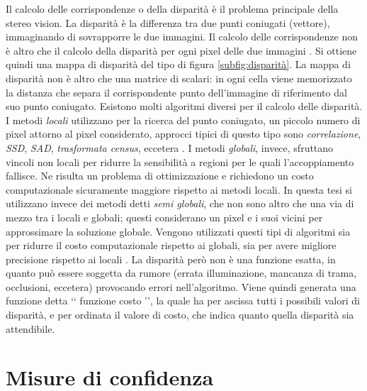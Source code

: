 \documentclass[12pt]{report}
\newcommand{\nullpage}{\newpage\null\thispagestyle{empty}}  %
\begin{document}
			
			
			Il calcolo delle corrispondenze o della disparità è il problema principale della stereo vision.	La disparità è la differenza tra due punti coniugati (vettore), immaginando di sovrapporre le due immagini. Il calcolo delle corrispondenze non è altro che il calcolo della disparità per ogni pixel delle due immagini \cite{fusiello}. Si ottiene quindi una mappa di disparità del tipo di figura \ref{subfig:disparità}. La mappa di disparità non è altro che una matrice di scalari: in ogni cella viene memorizzato la distanza che separa il corrispondente punto dell'immagine di riferimento dal suo punto coniugato.\newline
			Esistono molti algoritmi diversi per il calcolo delle disparità. I metodi \textit{locali} utilizzano per la ricerca del punto coniugato, un piccolo numero di pixel attorno al pixel considerato, approcci tipici di questo tipo sono \textit{correlazione}, \textit{SSD}, \textit{SAD}, \textit{trasformata census}, eccetera \cite{correlation}. I metodi \textit{globali}, invece, sfruttano vincoli non locali per ridurre la sensibilità a regioni per le quali l'accoppiamento fallisce. Ne risulta un problema di ottimizzazione e richiedono un costo computazionale sicuramente maggiore rispetto ai metodi locali. In questa tesi si utilizzano invece dei metodi detti \textit{semi globali}, che non sono altro che una via di mezzo tra i locali e globali; questi considerano un pixel e i suoi vicini per approssimare la soluzione globale. Vengono utilizzati questi tipi di algoritmi sia per ridurre il costo computazionale rispetto ai globali, sia per avere migliore precisione rispetto ai locali \cite{SGM}. La disparità però non è una funzione esatta, in quanto può essere soggetta da rumore (errata illuminazione, mancanza di trama, occlusioni, eccetera) provocando errori nell'algoritmo. Viene quindi generata una funzione detta ‘‘ funzione costo ’’, la quale ha per ascissa tutti i possibili valori di disparità, e per ordinata il valore di costo, che indica quanto quella disparità sia attendibile.  
			
			

	\nullpage
	
	\chapter{Misure di confidenza}
	\label{sec:confidenza}
	\pagestyle{fancy}
	
\end{document}
